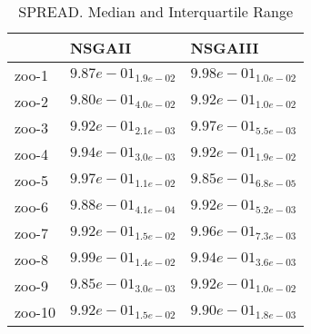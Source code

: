 \documentclass{article}
\begin{document}
\begin{table}
\caption{SPREAD. Median and Interquartile Range}
\label{table: SPREAD}
\centering
\begin{scriptsize}
\begin{tabular}{lll}
\hline & NSGAII &  NSGAIII\\
\hline 
zoo-1 & \cellcolor{gray95}$  9.87e-01_{ 1.9e-02}$ & \cellcolor{gray25}$  9.98e-01_{ 1.0e-02}$ \\
zoo-2 & \cellcolor{gray95}$  9.80e-01_{ 4.0e-02}$ & \cellcolor{gray25}$  9.92e-01_{ 1.0e-02}$ \\
zoo-3 & \cellcolor{gray95}$  9.92e-01_{ 2.1e-03}$ & \cellcolor{gray25}$  9.97e-01_{ 5.5e-03}$ \\
zoo-4 & \cellcolor{gray25}$  9.94e-01_{ 3.0e-03}$ & \cellcolor{gray95}$  9.92e-01_{ 1.9e-02}$ \\
zoo-5 & \cellcolor{gray25}$  9.97e-01_{ 1.1e-02}$ & \cellcolor{gray95}$  9.85e-01_{ 6.8e-05}$ \\
zoo-6 & \cellcolor{gray95}$  9.88e-01_{ 4.1e-04}$ & \cellcolor{gray25}$  9.92e-01_{ 5.2e-03}$ \\
zoo-7 & \cellcolor{gray95}$  9.92e-01_{ 1.5e-02}$ & \cellcolor{gray25}$  9.96e-01_{ 7.3e-03}$ \\
zoo-8 & \cellcolor{gray25}$  9.99e-01_{ 1.4e-02}$ & \cellcolor{gray95}$  9.94e-01_{ 3.6e-03}$ \\
zoo-9 & \cellcolor{gray95}$  9.85e-01_{ 3.0e-03}$ & \cellcolor{gray25}$  9.92e-01_{ 1.0e-02}$ \\
zoo-10 & \cellcolor{gray25}$  9.92e-01_{ 1.5e-02}$ & \cellcolor{gray95}$  9.90e-01_{ 1.8e-03}$ \\
\hline
\end{tabular}
\end{scriptsize}
\end{table}
\end{document}
